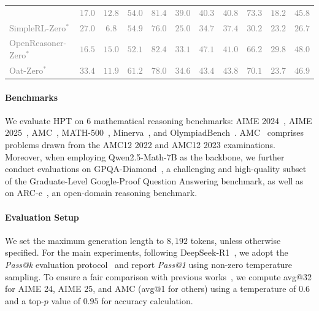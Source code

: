 \documentclass{article} %
\newcommand{\0}{\mathbb{0}}
\newcommand{\1}{\mathbb{1}}
\newcommand{\mot}{\textcolor{black}{HPT}\xspace}
\begin{document}
\begin{table}[!t]
{\begin{tabular}{lccccccc|ccc}
  & \textcolor{gray}{$17.0$} & \textcolor{gray}{$12.8$} & \textcolor{gray}{$54.0$} & \textcolor{gray}{$81.4$} & \textcolor{gray}{$39.0$} & \textcolor{gray}{$40.3$} & \textcolor{gray}{$40.8$} & \textcolor{gray}{$73.3$} & \textcolor{gray}{$18.2$} & \textcolor{gray}{$45.8$} \\
\textcolor{gray}{SimpleRL-Zero$^*$}                                 
  & \textcolor{gray}{$27.0$} & \textcolor{gray}{$6.8$}  & \textcolor{gray}{$54.9$} & \textcolor{gray}{$76.0$} & \textcolor{gray}{$25.0$} & \textcolor{gray}{$34.7$} & \textcolor{gray}{$37.4$} & \textcolor{gray}{$30.2$} & \textcolor{gray}{$23.2$} & \textcolor{gray}{$26.7$} \\
\textcolor{gray}{OpenReasoner-Zero$^*$}                             
  & \textcolor{gray}{$16.5$} & \textcolor{gray}{$15.0$} & \textcolor{gray}{$52.1$} & \textcolor{gray}{$82.4$} & \textcolor{gray}{$33.1$} & \textcolor{gray}{$47.1$} & \textcolor{gray}{$41.0$} & \textcolor{gray}{$66.2$} & \textcolor{gray}{$29.8$} & \textcolor{gray}{$48.0$} \\
\textcolor{gray}{Oat-Zero$^*$}                                  
  & \textcolor{gray}{$33.4$} & \textcolor{gray}{$11.9$} & \textcolor{gray}{$61.2$} & \textcolor{gray}{$78.0$} & \textcolor{gray}{$34.6$} & \textcolor{gray}{$43.4$} & \textcolor{gray}{$43.8$} & \textcolor{gray}{$70.1$} & \textcolor{gray}{$23.7$} & \textcolor{gray}{$46.9$} \\
\bottomrule
\end{tabular}
}
\end{table}

\paragraph{Benchmarks}
We evaluate \mot on $6$ mathematical reasoning benchmarks: AIME 2024~\citep{li2024numinamath},  AIME 2025~\citep{li2024numinamath}, AMC~\citep{li2024numinamath}, MATH-500~\citep{hendrycks2021measuring},  Minerva~\citep{lewkowycz2022solving}, and OlympiadBench~\citep{he2024olympiadbench}.
AMC~\citep{li2024numinamath} comprises problems drawn from the AMC12 2022 and AMC12 2023 examinations.
Moreover, when employing Qwen2.5-Math-7B as the backbone, we further conduct evaluations on GPQA-Diamond~\citep{rein2024gpqa}, a challenging and high-quality subset of the Graduate-Level Google-Proof Question Answering benchmark, as well as on ARC-c~\citep{clark2018think}, an open-domain reasoning benchmark.

\paragraph{Evaluation Setup}
We set the maximum generation length to $8,192$ tokens, unless otherwise specified.
For the main experiments, following DeepSeek-R1~\citep{guo2025deepseek}, we adopt the \emph{Pass@k} evaluation protocol~\citep{chen2021evaluating} and report \emph{Pass@1} using non-zero temperature sampling.
To ensure a fair comparison with previous works~\citep{yan2025learning,fu2025srft}, we compute avg@32 for AIME 24, AIME 25, and AMC (avg@1 for others) using a temperature of $0.6$ and a top-$p$ value of $0.95$ for accuracy calculation.
\end{document}
